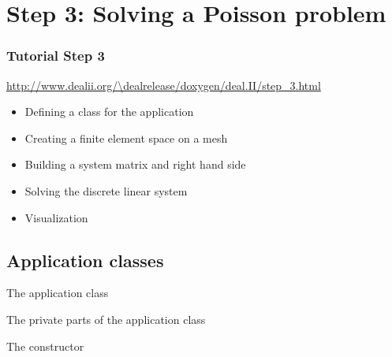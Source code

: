 \section[Step3]{Step 3: Solving a Poisson problem}

\begin{frame}
  \frametitle{Tutorial Step 3}
  {\footnotesize{\url{http://www.dealii.org/\dealrelease/doxygen/deal.II/step_3.html}}}
  \begin{itemize}
  \item Defining a class for the application
  \item Creating a finite element space on a mesh
  \item Building a system matrix and right hand side
  \item Solving the discrete linear system
  \item Visualization
  \end{itemize}
\end{frame}

\subsection{Application classes}
\begin{frame}
  \begin{block}{The application class}
    
  \end{block}
\end{frame}

\begin{frame}
  \begin{block}{The private parts of the application class}
        
  \end{block}
\end{frame}

\begin{frame}
  \begin{block}{The constructor}
  
  \end{block}
\end{frame}


